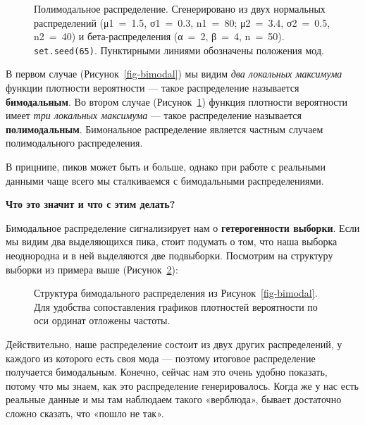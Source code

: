 \documentclass[
  letterpaper,
]{scrbook}
\theoremstyle{definition}
\theoremstyle{remark}
\begin{document}
\begin{figure}


\caption{\label{fig-polymodal}Полимодальное распределение. Сгенерировано
из двух нормальных распределений (μ1~=~1.5, σ1~=~0.3, n1~=~80; μ2~=~3.4,
σ2~=~0.5, n2~=~40) и бета-распределения (α~=~2, β~=~4, n~=~50).
\texttt{set.seed(65)}. Пунктирными линиями обозначены положения мод.}

\end{figure}%

В первом случае (Рисунок~\ref{fig-bimodal}) мы видим \emph{два локальных
максимума} функции плотности вероятности --- такое распределение
называется \textbf{бимодальным}. Во втором случае
(Рисунок~\ref{fig-polymodal}) функция плотности вероятности имеет
\emph{три локальных максимума} --- такое распределение называется
\textbf{полимодальным}. Бимональное распределение является частным
случаем полимодального распределения.

В прицнипе, пиков может быть и больше, однако при работе с реальными
данными чаще всего мы сталкиваемся с бимодальными распределениями.

\textbf{Что это значит и что с этим делать?}

Бимодальное распределение сигнализирует нам о \textbf{гетерогенности
выборки}. Если мы видим два выделяющихся пика, стоит подумать о том, что
наша выборка неоднородна и в ней выделяются две подвыборки. Посмотрим на
структуру выборки из примера выше (Рисунок~\ref{fig-bimodal-struct}):

\begin{figure}


\caption{\label{fig-bimodal-struct}Структура бимодального распределения
из Рисунок~\ref{fig-bimodal}. Для удобства сопоставления графиков
плотностей вероятности по оси ординат отложены частоты.}

\end{figure}%

Действительно, наше распределение состоит из двух других распределений,
у каждого из которого есть своя мода --- поэтому итоговое распределение
получается бимодальным. Конечно, сейчас нам это очень удобно показать,
потому что мы знаем, как это распределение генерировалось. Когда же у
нас есть реальные данные и мы там наблюдаем такого «верблюда», бывает
достаточно сложно сказать, что «пошло не так».
\end{document}
